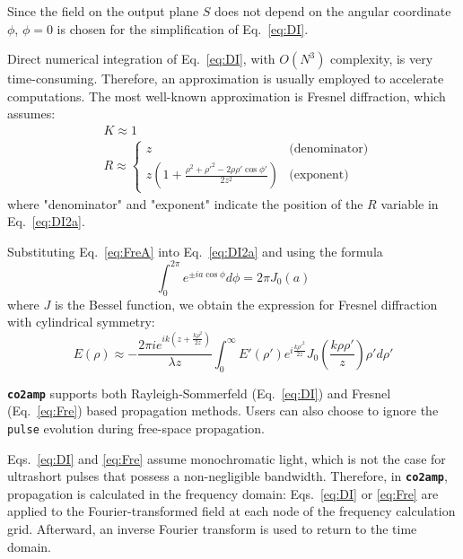 \documentclass{report}
\begin{document}
Since the field on the output plane \(S\) does not depend on the angular coordinate \(\phi\), \(\phi = 0\) is chosen for the simplification of Eq.~\ref{eq:DI}.

Direct numerical integration of Eq.~\ref{eq:DI}, with \(O(N^3)\) complexity, is very time-consuming. Therefore, an approximation is usually employed to accelerate computations. The most well-known approximation is Fresnel diffraction, which assumes:
\begin{equation} \label{eq:FreA}
 \begin{split}
  &K \approx 1\\
  &R \approx
  \begin{cases}
   z & \text{(denominator)}\\
   z \left(1 + \frac{\rho^2 + \rho'^2 - 2\rho\rho'\cos\phi'}{2z^2}\right) & \text{(exponent)}
  \end{cases}
 \end{split}
\end{equation}
where "denominator" and "exponent" indicate the position of the \(R\) variable in Eq.~\ref{eq:DI2a}.

Substituting Eq.~\ref{eq:FreA} into Eq.~\ref{eq:DI2a} and using the formula
\begin{equation} \label{eq:formula}
 \int_{0}^{2\pi} e^{\pm i a \cos\phi}  d\phi = 2 \pi J_0(a)
\end{equation}
where \(J\) is the Bessel function, we obtain the expression for Fresnel diffraction with cylindrical symmetry:
\begin{equation} \label{eq:Fre}
 E(\rho) \approx -\frac{2 \pi i e^{ik\left(z+\frac{k\rho^2}{2z}\right)}}{\lambda z}
 \int_0^\infty E'(\rho') e^{i\frac{k\rho'^2}{2z}} J_0 \left(\frac{k\rho\rho'}{z}\right) \rho' d\rho'
\end{equation}

\textbf{\texttt{co2amp}} supports both Rayleigh-Sommerfeld (Eq.~\ref{eq:DI}) and Fresnel (Eq.~\ref{eq:Fre}) based propagation methods. Users can also choose to ignore the \texttt{pulse} evolution during free-space propagation.

Eqs.~\ref{eq:DI} and \ref{eq:Fre} assume monochromatic light, which is not the case for ultrashort pulses that possess a non-negligible bandwidth. Therefore, in \textbf{\texttt{co2amp}}, propagation is calculated in the frequency domain: Eqs.~\ref{eq:DI} or \ref{eq:Fre} are applied to the Fourier-transformed field at each node of the frequency calculation grid. Afterward, an inverse Fourier transform is used to return to the time domain.
\end{document}

